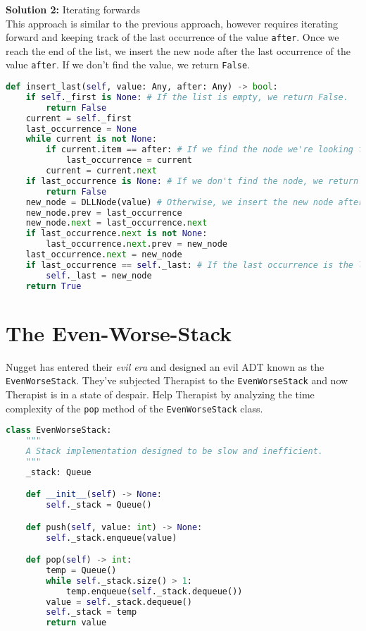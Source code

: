 \documentclass{article}
\begin{document}
\textbf{Solution 2:} Iterating forwards\\
This approach is similar to the previous approach, however requires iterating forward and keeping track of the last occurrence of the value \texttt{after}. Once we reach the end of the list, we insert the new node after the last occurrence of the value \texttt{after}. If we don't find the value, we return \texttt{False}.

\begin{lstlisting}[language=Python, style=mystyle]
def insert_last(self, value: Any, after: Any) -> bool:
    if self._first is None: # If the list is empty, we return False.
        return False
    current = self._first
    last_occurrence = None
    while current is not None:
        if current.item == after: # If we find the node we're looking for, we update the last occurrence pointer.
            last_occurrence = current
        current = current.next
    if last_occurrence is None: # If we don't find the node, we return False.
        return False
    new_node = DLLNode(value) # Otherwise, we insert the new node after the last occurrence of the node.
    new_node.prev = last_occurrence
    new_node.next = last_occurrence.next
    if last_occurrence.next is not None:
        last_occurrence.next.prev = new_node
    last_occurrence.next = new_node
    if last_occurrence == self._last: # If the last occurrence is the last node, we update the last pointer.
        self._last = new_node
    return True
\end{lstlisting}

\section{The Even-Worse-Stack}
Nugget has entered their \textit{evil era} and designed an evil ADT known as the \texttt{EvenWorseStack}. 
They've subjected Therapist to the \texttt{EvenWorseStack} and now Therapist is in a state of despair. Help Therapist by analyzing the time complexity of the \texttt{pop} method of the \texttt{EvenWorseStack} class.\\

\begin{lstlisting}[language=Python, style=mystyle]
class EvenWorseStack:
    """
    A Stack implementation designed to be slow and inefficient.
    """
    _stack: Queue

    def __init__(self) -> None:
        self._stack = Queue()

    def push(self, value: int) -> None:
        self._stack.enqueue(value)

    def pop(self) -> int:
        temp = Queue()
        while self._stack.size() > 1:
            temp.enqueue(self._stack.dequeue())
        value = self._stack.dequeue()
        self._stack = temp
        return value
\end{lstlisting}
  
\end{document}
